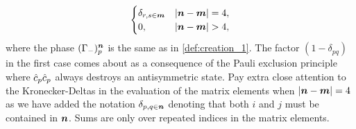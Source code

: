 \begin{lemma}
\begin{gather}
\begin{cases}
                        \delta_{r, s \in \boldsymbol{m}}
                        & \abs{\boldsymbol{n} - \boldsymbol{m}} = 4,
                        \\
                        0, & \abs{\boldsymbol{n} - \boldsymbol{m}} > 4,
                    \end{cases}
                \end{gather}
                where the phase $(\Gamma_{-})^{\boldsymbol{n}}_{p}$ is the same as in
                \autoref{def:creation_1}.
                The factor $(1 - \delta_{pq})$ in the first case comes about as
                a consequence of the Pauli exclusion principle where
                $\hat{c}_{p}\hat{c}_{p}$ always destroys an antisymmetric state.
                Pay extra close attention to the Kronecker-Deltas in the
                evaluation of the matrix elements when $\abs{\boldsymbol{n} - \boldsymbol{m}}
                = 4$ as we have added the notation $\delta_{p, q \in \boldsymbol{n}}$
                denoting that both $i$ and $j$ must be contained in $\boldsymbol{n}$.
                Sums are only over repeated indices in the matrix elements.
            \end{lemma}

